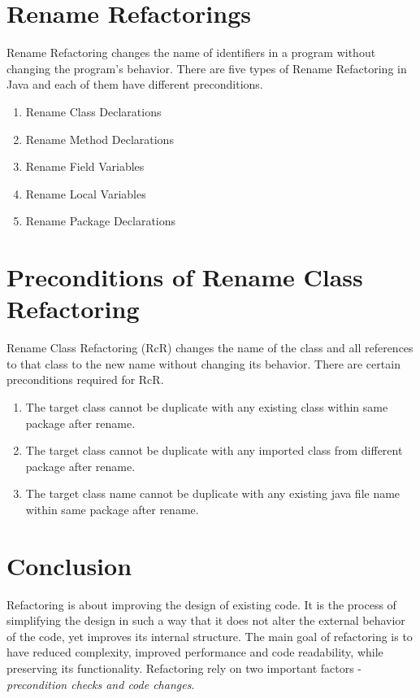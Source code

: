 \documentclass[10pt,conference]{IEEEtran}
\begin{document}
\section{\textbf{Rename Refactorings}}
Rename Refactoring changes the name of identifiers in a program without changing the program's behavior.
There are five types of Rename Refactoring in Java and each of them have different preconditions. 
\begin{enumerate}
	\item Rename Class Declarations 
	\item Rename Method Declarations  
	\item Rename Field Variables
	\item Rename Local Variables 
	\item Rename Package Declarations
\end{enumerate}

\section{\textbf{Preconditions of Rename Class Refactoring}}
Rename Class Refactoring (RcR) changes the name of the class and all references to that class to the new name without changing its behavior. There are certain preconditions required for RcR. 
\begin{enumerate}
	\item The target class cannot be duplicate with any existing class within same package after rename.
	\item The target class cannot be duplicate with any imported class from different package after rename.
	\item The target class name cannot be duplicate with any existing java file name within same package after rename.
\end{enumerate}

\label{sec:precon1}
	
\label{sec:precon2}

\label{sec:precon3}









\section{\textbf{Conclusion}}
Refactoring is about improving the design of existing code. It is the process of simplifying the design in such a way that it does not alter the external behavior of the code, yet improves its internal structure. The main goal of refactoring is to have reduced complexity, improved performance and code readability, while preserving its functionality. Refactoring rely on two important factors -  \emph{precondition checks and code changes}.
\end{document}
